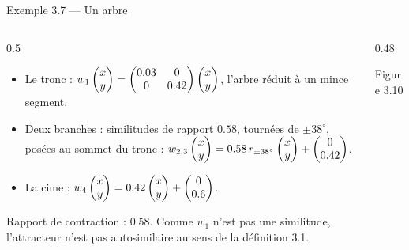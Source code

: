 \begin{frame}{Exemple 3.7 --- Un arbre}
  \begin{columns}[c]
    \begin{column}{0.5\textwidth}
      \footnotesize
      \begin{itemize}
        \item Le tronc :
          $w_1\begin{pmatrix}x\\ y\end{pmatrix} = \begin{pmatrix}\num{0.03} & 0\\ 0 & \num{0.42}\end{pmatrix}\begin{pmatrix}x\\ y\end{pmatrix}$,
          l'arbre réduit à un mince segment.
        \item Deux branches : similitudes de rapport $\num{0.58}$,
          tournées de $\pm38^\circ$, posées au sommet du tronc :
          $w_{2,3}\begin{pmatrix}x\\ y\end{pmatrix} = \num{0.58}\,r_{\pm38^\circ}\begin{pmatrix}x\\ y\end{pmatrix}
          + \begin{pmatrix}0\\ \num{0.42}\end{pmatrix}$.
        \item La cime :
          $w_4\begin{pmatrix}x\\ y\end{pmatrix} = \num{0.42}\begin{pmatrix}x\\ y\end{pmatrix}+\begin{pmatrix}0\\ \num{0.6}\end{pmatrix}$.
      \end{itemize}
      Rapport de contraction : $\num{0.58}$. Comme $w_1$ n'est pas une
      similitude, l'attracteur n'est pas autosimilaire au sens de la
      définition 3.1.
    \end{column}
    \begin{column}{0.48\textwidth}
      \begin{center}\scriptsize Figure 3.10\end{center}
    \end{column}
  \end{columns}
\end{frame}


